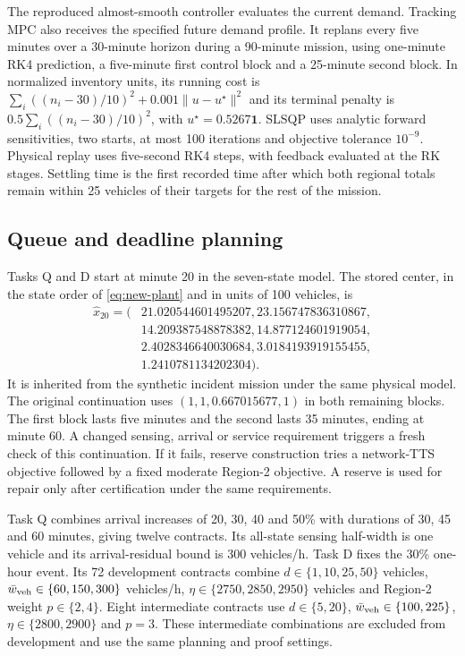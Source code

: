 \documentclass[journal,10pt]{IEEEtran}
\begin{document}
The reproduced almost-smooth controller evaluates the current demand.
Tracking MPC also receives the specified future demand profile. It replans
every five minutes over a 30-minute horizon during a 90-minute mission,
using one-minute RK4 prediction, a five-minute first control block and a
25-minute second block. In normalized inventory units, its running cost is
$\sum_i((n_i-30)/10)^2+0.001\|u-u^\star\|^2$ and its terminal penalty is
$0.5\sum_i((n_i-30)/10)^2$, with $u^\star=0.5267\mathbf1$.
SLSQP uses analytic forward sensitivities, two starts, at most 100
iterations and objective tolerance $10^{-9}$. Physical replay uses
five-second RK4 steps, with feedback evaluated at the RK stages. Settling
time is the first recorded time after which both regional totals remain
within 25 vehicles of their targets for the rest of the mission.

\subsection{Queue and deadline planning}
\label{sec:supp-queue-settings}
Tasks Q and D start at minute 20 in the seven-state model. The stored center,
in the state order of \eqref{eq:new-plant} and in units of 100 vehicles, is
\[
\begin{aligned}
\widehat x_{20}=(&21.020544601495207,23.156747836310867,\\
&14.209387548878382,14.877124601919054,\\
&2.4028346640030684,3.0184193919155455,\\
&1.2410781134202304).
\end{aligned}
\]
It is inherited from the synthetic incident mission under the same
physical model. The original continuation uses
$(1,1,0.667015677,1)$ in both remaining blocks. The first block lasts five
minutes and the second lasts 35 minutes, ending at minute 60. A changed
sensing, arrival or service requirement triggers a fresh check of this
continuation. If it fails, reserve construction tries a network-TTS
objective followed by a fixed moderate Region-2 objective. A reserve is
used for repair only after certification under the same requirements.

Task Q combines arrival increases of 20, 30, 40 and 50\% with durations of
30, 45 and 60 minutes, giving twelve contracts. Its all-state sensing
half-width is one vehicle and its arrival-residual bound is 300 vehicles/h.
Task D fixes the 30\% one-hour event. Its 72 development contracts combine
$d\in\{1,10,25,50\}$ vehicles,
$\bar w_{\rm veh}\in\{60,150,300\}$ vehicles/h,
$\eta\in\{2750,2850,2950\}$ vehicles and Region-2 weight $p\in\{2,4\}$.
Eight intermediate contracts use $d\in\{5,20\}$,
$\bar w_{\rm veh}\in\{100,225\}$, $\eta\in\{2800,2900\}$ and $p=3$.
These intermediate combinations are excluded from development and use
the same planning and proof settings.
\end{document}
